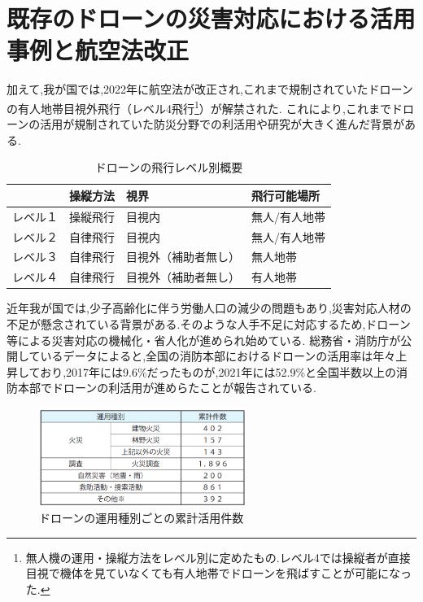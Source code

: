 \section{既存のドローンの災害対応における活用事例と航空法改正}
加えて,我が国では,2022年に航空法が改正され,これまで規制されていたドローンの有人地帯目視外飛行（レベル4飛行\footnote{無人機の運用・操縦方法をレベル別に定めたもの.レベル4では操縦者が直接目視で機体を見ていなくても有人地帯でドローンを飛ばすことが可能になった.}）が解禁された.
これにより,これまでドローンの活用が規制されていた防災分野での利活用や研究が大きく進んだ背景がある.\par 
\begin{table}[H]
  \begin{tabular}{|l|lll|}
  \hline
       & 操縦方法 & 視界         & 飛行可能場所  \\ \hline
  レベル１ & 操縦飛行 & 目視内        & 無人/有人地帯 \\ \hline
  レベル２ & 自律飛行 & 目視内        & 無人/有人地帯 \\ \hline
  レベル３ & 自律飛行 & 目視外（補助者無し） & 無人地帯    \\ \hline
  レベル４ & 自律飛行 & 目視外（補助者無し） & 有人地帯    \\ \hline
  \end{tabular}
  \caption{ドローンの飛行レベル別概要}
\end{table}
近年我が国では,少子高齢化に伴う労働人口の減少の問題もあり,災害対応人材の不足が懸念されている背景がある.そのような人手不足に対応するため,ドローン等による災害対応の機械化・省人化が進められ始めている.
総務省・消防庁が公開しているデータ\cite{soumusho-01}によると,全国の消防本部におけるドローンの活用率は年々上昇しており,2017年には9.6\%だったものが,2021年には52.9\%と全国半数以上の消防本部でドローンの利活用が進めらたことが報告されている.
\begin{figure}[H] 
  \centering 
  \includegraphics[width=0.6\textwidth]{Figures/2024-11-28 215911.png}
  \caption{ドローンの運用種別ごとの累計活用件数} 
  \label{fig:01} 
\end{figure}



